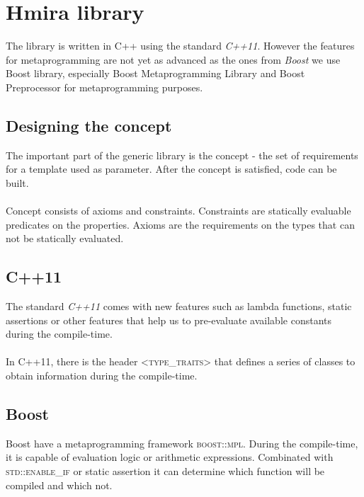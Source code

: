 \chapter{Hmira library}

The library is written in C++ using the standard \emph{C++11}\cite{Naugler2013}. However the features
for metaprogramming are not yet as advanced as the ones from \emph{Boost}\cite{Abrahams2004} we
use Boost library, especially Boost Metaprogramming Library and Boost Preprocessor for
metaprogramming purposes.

\section{Designing the concept}

The important part of the generic library is the concept - the set of requirements for a template
used as parameter. After the concept is satisfied, code can be built.\\
\\
Concept consists of axioms and constraints\cite{Sutton2012}. Constraints are statically evaluable
predicates on the properties. Axioms are the requirements on the types that can not be statically
evaluated.

\section{C++11}

The standard \emph{C++11} comes with new features such as lambda functions, static assertions or other
features that help us to pre-evaluate available constants during the compile-time.\\
\\
In C++11, there is the header \textsc{\textless type\_traits\textgreater} that defines
a series of classes to obtain information during the compile-time.

\section{Boost}

Boost have a metaprogramming framework \textsc{boost::mpl}. During the compile-time, it is
capable of evaluation logic or arithmetic expressions. Combinated with \textsc{std::enable\_if}
or static assertion it can determine which function will be compiled and which not.